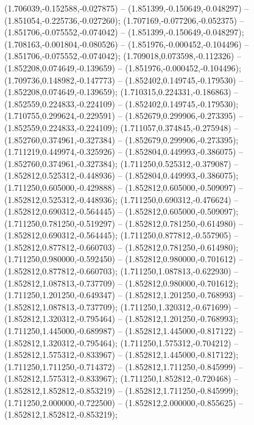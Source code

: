  (1.706039,-0.152588,-0.027875) -- (1.851399,-0.150649,-0.048297) -- (1.851054,-0.225736,-0.027260);
 (1.707169,-0.077206,-0.052375) -- (1.851706,-0.075552,-0.074042) -- (1.851399,-0.150649,-0.048297);
 (1.708163,-0.001804,-0.080526) -- (1.851976,-0.000452,-0.104496) -- (1.851706,-0.075552,-0.074042);
 (1.709018,0.073598,-0.112326) -- (1.852208,0.074649,-0.139659) -- (1.851976,-0.000452,-0.104496);
 (1.709736,0.148982,-0.147773) -- (1.852402,0.149745,-0.179530) -- (1.852208,0.074649,-0.139659);
 (1.710315,0.224331,-0.186863) -- (1.852559,0.224833,-0.224109) -- (1.852402,0.149745,-0.179530);
 (1.710755,0.299624,-0.229591) -- (1.852679,0.299906,-0.273395) -- (1.852559,0.224833,-0.224109);
 (1.711057,0.374845,-0.275948) -- (1.852760,0.374961,-0.327384) -- (1.852679,0.299906,-0.273395);
 (1.711219,0.449974,-0.325926) -- (1.852804,0.449993,-0.386075) -- (1.852760,0.374961,-0.327384);
 (1.711250,0.525312,-0.379087) -- (1.852812,0.525312,-0.448936) -- (1.852804,0.449993,-0.386075);
 (1.711250,0.605000,-0.429888) -- (1.852812,0.605000,-0.509097) -- (1.852812,0.525312,-0.448936);
 (1.711250,0.690312,-0.476624) -- (1.852812,0.690312,-0.564445) -- (1.852812,0.605000,-0.509097);
 (1.711250,0.781250,-0.519297) -- (1.852812,0.781250,-0.614980) -- (1.852812,0.690312,-0.564445);
 (1.711250,0.877812,-0.557905) -- (1.852812,0.877812,-0.660703) -- (1.852812,0.781250,-0.614980);
 (1.711250,0.980000,-0.592450) -- (1.852812,0.980000,-0.701612) -- (1.852812,0.877812,-0.660703);
 (1.711250,1.087813,-0.622930) -- (1.852812,1.087813,-0.737709) -- (1.852812,0.980000,-0.701612);
 (1.711250,1.201250,-0.649347) -- (1.852812,1.201250,-0.768993) -- (1.852812,1.087813,-0.737709);
 (1.711250,1.320312,-0.671699) -- (1.852812,1.320312,-0.795464) -- (1.852812,1.201250,-0.768993);
 (1.711250,1.445000,-0.689987) -- (1.852812,1.445000,-0.817122) -- (1.852812,1.320312,-0.795464);
 (1.711250,1.575312,-0.704212) -- (1.852812,1.575312,-0.833967) -- (1.852812,1.445000,-0.817122);
 (1.711250,1.711250,-0.714372) -- (1.852812,1.711250,-0.845999) -- (1.852812,1.575312,-0.833967);
 (1.711250,1.852812,-0.720468) -- (1.852812,1.852812,-0.853219) -- (1.852812,1.711250,-0.845999);
 (1.711250,2.000000,-0.722500) -- (1.852812,2.000000,-0.855625) -- (1.852812,1.852812,-0.853219);
